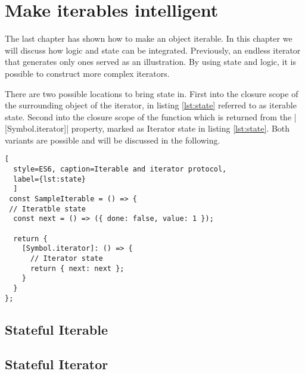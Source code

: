 \section{Make iterables intelligent}
The last chapter has shown how to make an object iterable. In this chapter we will
discuss how logic and state can be integrated. Previously, an endless iterator
that generates only ones served as an illustration. By using state and logic, 
it is possible to construct more complex iterators.  
\par
There are two possible locations to bring state in. First into the 
closure scope of the surrounding object of the iterator, in listing  
\ref{lst:state} referred to as iterable state. Second into the closure scope of 
the function which is returned from the |[Symbol.iterator]| property, marked as 
Iterator state in listing \ref{lst:state}. Both variants are possible and will 
be discussed in the following.

\begin{lstlisting}[
  style=ES6, caption=Iterable and iterator protocol,
  label={lst:state}
  ]
 const SampleIterable = () => {
 // Iteratble state
  const next = () => ({ done: false, value: 1 });

  return {
    [Symbol.iterator]: () => {
      // Iterator state
      return { next: next };
    }
  }
};
\end{lstlisting}

\subsection{Stateful Iterable}



\subsection{Stateful Iterator}
